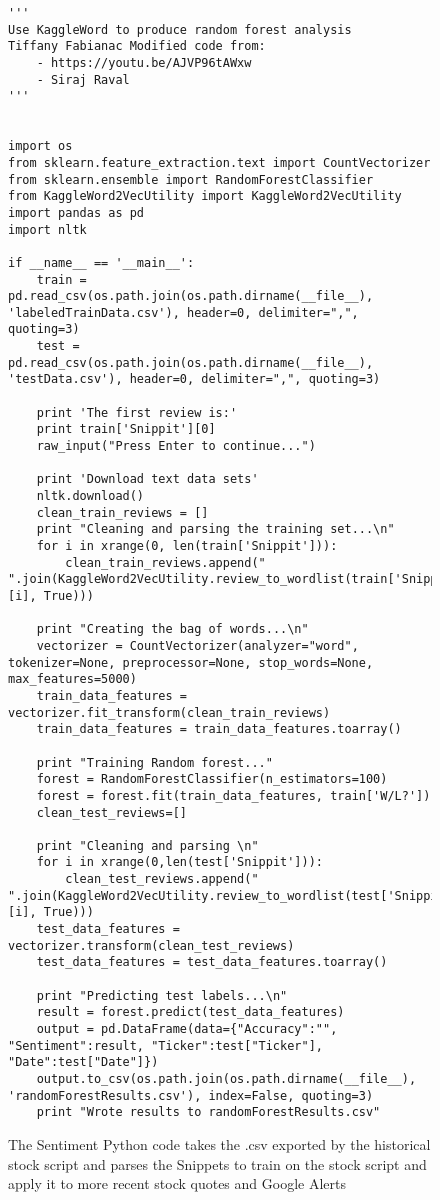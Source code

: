 \documentclass[sigconf]{acmart}
\begin{document}
\begin{figure}[htb]
\begin{verbatim}
'''
Use KaggleWord to produce random forest analysis
Tiffany Fabianac Modified code from:
    - https://youtu.be/AJVP96tAWxw
    - Siraj Raval
'''


import os
from sklearn.feature_extraction.text import CountVectorizer
from sklearn.ensemble import RandomForestClassifier
from KaggleWord2VecUtility import KaggleWord2VecUtility
import pandas as pd
import nltk

if __name__ == '__main__':
    train = pd.read_csv(os.path.join(os.path.dirname(__file__), 'labeledTrainData.csv'), header=0, delimiter=",", quoting=3)
    test = pd.read_csv(os.path.join(os.path.dirname(__file__), 'testData.csv'), header=0, delimiter=",", quoting=3)

    print 'The first review is:'
    print train['Snippit'][0]
    raw_input("Press Enter to continue...")

    print 'Download text data sets'
    nltk.download()
    clean_train_reviews = []
    print "Cleaning and parsing the training set...\n"
    for i in xrange(0, len(train['Snippit'])):
        clean_train_reviews.append(" ".join(KaggleWord2VecUtility.review_to_wordlist(train['Snippit'][i], True)))

    print "Creating the bag of words...\n"
    vectorizer = CountVectorizer(analyzer="word", tokenizer=None, preprocessor=None, stop_words=None, max_features=5000)
    train_data_features = vectorizer.fit_transform(clean_train_reviews)
    train_data_features = train_data_features.toarray()

    print "Training Random forest..."
    forest = RandomForestClassifier(n_estimators=100)
    forest = forest.fit(train_data_features, train['W/L?'])
    clean_test_reviews=[]

    print "Cleaning and parsing \n"
    for i in xrange(0,len(test['Snippit'])):
        clean_test_reviews.append(" ".join(KaggleWord2VecUtility.review_to_wordlist(test['Snippit'][i], True)))
    test_data_features = vectorizer.transform(clean_test_reviews)
    test_data_features = test_data_features.toarray()

    print "Predicting test labels...\n"
    result = forest.predict(test_data_features)
    output = pd.DataFrame(data={"Accuracy":"", "Sentiment":result, "Ticker":test["Ticker"], "Date":test["Date"]})
    output.to_csv(os.path.join(os.path.dirname(__file__), 'randomForestResults.csv'), index=False, quoting=3)
    print "Wrote results to randomForestResults.csv"
\end{verbatim}
\caption{The Sentiment Python code takes the .csv exported by the historical stock script and parses the Snippets to train on the stock script and apply it to more recent stock quotes and Google Alerts}\label{c:sentiment}
\end{figure}
\end{document}
